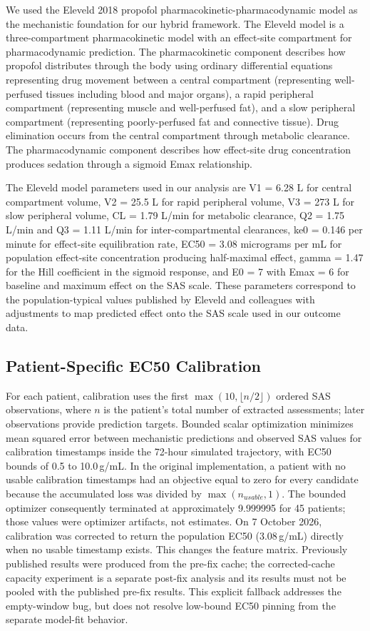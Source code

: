 \documentclass[11pt,a4paper]{article}
\begin{document}
We used the Eleveld 2018 propofol pharmacokinetic-pharmacodynamic model \cite{eleveld_2018} as the mechanistic foundation for our hybrid framework. The Eleveld model is a three-compartment pharmacokinetic model with an effect-site compartment for pharmacodynamic prediction. The pharmacokinetic component describes how propofol distributes through the body using ordinary differential equations representing drug movement between a central compartment (representing well-perfused tissues including blood and major organs), a rapid peripheral compartment (representing muscle and well-perfused fat), and a slow peripheral compartment (representing poorly-perfused fat and connective tissue). Drug elimination occurs from the central compartment through metabolic clearance. The pharmacodynamic component describes how effect-site drug concentration produces sedation through a sigmoid Emax relationship.

The Eleveld model parameters used in our analysis are V1 = 6.28 L for central compartment volume, V2 = 25.5 L for rapid peripheral volume, V3 = 273 L for slow peripheral volume, CL = 1.79 L/min for metabolic clearance, Q2 = 1.75 L/min and Q3 = 1.11 L/min for inter-compartmental clearances, ke0 = 0.146 per minute for effect-site equilibration rate, EC50 = 3.08 micrograms per mL for population effect-site concentration producing half-maximal effect, gamma = 1.47 for the Hill coefficient in the sigmoid response, and E0 = 7 with Emax = 6 for baseline and maximum effect on the SAS scale. These parameters correspond to the population-typical values published by Eleveld and colleagues with adjustments to map predicted effect onto the SAS scale used in our outcome data.

\subsection{Patient-Specific EC50 Calibration}

For each patient, calibration uses the first $\max(10,\lfloor n/2\rfloor)$ ordered SAS observations, where $n$ is the patient's total number of extracted assessments; later observations provide prediction targets. Bounded scalar optimization minimizes mean squared error between mechanistic predictions and observed SAS values for calibration timestamps inside the 72-hour simulated trajectory, with EC50 bounds of 0.5 to 10.0\,\textmu g/mL. In the original implementation, a patient with no usable calibration timestamps had an objective equal to zero for every candidate because the accumulated loss was divided by $\max(n_{usable},1)$. The bounded optimizer consequently terminated at approximately 9.999995 for 45 patients; those values were optimizer artifacts, not estimates. On 7 October 2026, calibration was corrected to return the population EC50 (3.08\,\textmu g/mL) directly when no usable timestamp exists. This changes the feature matrix. Previously published results were produced from the pre-fix cache; the corrected-cache capacity experiment is a separate post-fix analysis and its results must not be pooled with the published pre-fix results. This explicit fallback addresses the empty-window bug, but does not resolve low-bound EC50 pinning from the separate model-fit behavior.
\end{document}

